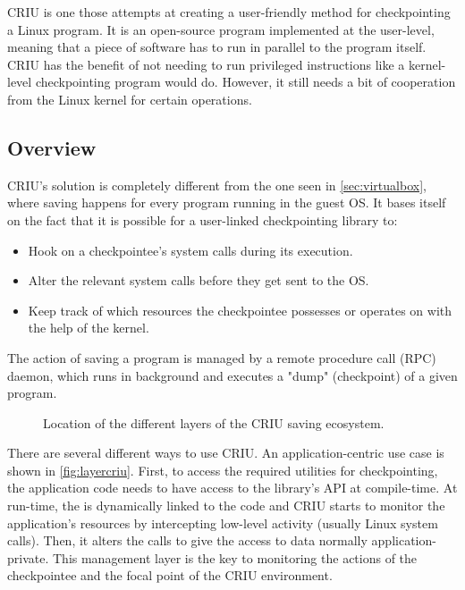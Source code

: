 \gls{CRIU} is one those attempts at creating a user-friendly method for checkpointing a Linux program. It is an open-source program \cite{online:criucode} implemented at the user-level, meaning that a piece of software has to run in parallel to the program itself. CRIU has the benefit of not needing to run privileged instructions like a kernel-level checkpointing program would do. However, it still needs a bit of cooperation from the Linux kernel for certain operations.

\subsection*{Overview}
\gls{CRIU}'s solution is completely different from the one seen in \autoref{sec:virtualbox}, where saving happens for every program running in the guest OS. It bases itself on the fact that it is possible for a user-linked checkpointing library to:
\begin{itemize}
	\item Hook on a checkpointee's system calls during its execution.
	\item Alter the relevant system calls before they get sent to the OS.
	\item Keep track of which resources the checkpointee possesses or operates on with the help of the kernel.
\end{itemize}
The action of saving a program is managed by a remote procedure call (RPC) daemon, which runs in background and executes a "dump" (checkpoint) of a given program. 
\begin{figure}[htbp]
	\centering \small
	
	\caption{Location of the different layers of the CRIU saving ecosystem.}
	\label{fig:layercriu}
\end{figure}

There are several different ways to use \gls{CRIU}. An application-centric use case is shown in \autoref{fig:layercriu}. First, to access the required utilities for checkpointing, the application code needs to have access to the library's API at compile-time. At run-time, the  is dynamically linked to the code and CRIU starts to monitor the application's resources by intercepting low-level activity (usually Linux system calls). Then, it alters the calls to give the access to data normally application-private. This management layer is the key to monitoring the actions of the checkpointee and the focal point of the CRIU environment.

